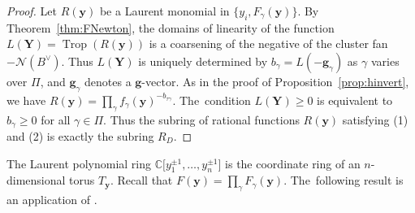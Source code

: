 \documentclass[10pt,a4paper]{amsart}
\def\C{{\mathbb C}}
\def\y{{\mathbf y}}
\def\N{{\mathcal{N}}}
\def\Trop{\operatorname{Trop}}
\def\g{{\mathbf g}}
\def\Y{{\mathbf Y}}
\numberwithin{equation}{section}
\begin{document}
\begin{proof}
Let $R(\y)$ be a Laurent monomial in $\{y_i, F_\gamma(\y)\}$. By Theorem~\ref{thm:FNewton}, the domains of linearity of the function $L(\Y) = \Trop(R(\y))$ is a coarsening of the negative of the cluster fan $-\N(B^\vee)$. Thus $L(\Y)$ is uniquely determined by $b_\gamma = L(-\g_\gamma)$ as $\gamma$ varies over $\Pi$, and $\g_\gamma$ denotes a $\g$-vector. As in the proof of Proposition~\ref{prop:hinvert}, we have $R(\y) = \prod_\gamma f_\gamma(\y)^{-b_{\tau\gamma}}$. The~condition $L(\Y) \geq 0$ is equivalent to $b_\gamma \geq 0$ for all $\gamma \in \Pi$. Thus the subring of rational functions $R(\y)$ satisfying (1) and (2) is exactly the subring $R_D$.
\end{proof}

\medskip{}
The Laurent polynomial ring $\C\big[y_1^{\pm 1}, \dots, y_n^{\pm 1}\big]$ is the coordinate ring of an $n$-dimensional torus $T_\y$. Recall that $F(\y) = \prod_\gamma F_\gamma(\y)$. The~following result is an application of \cite[Section~10]{AHL}.
\end{document}
